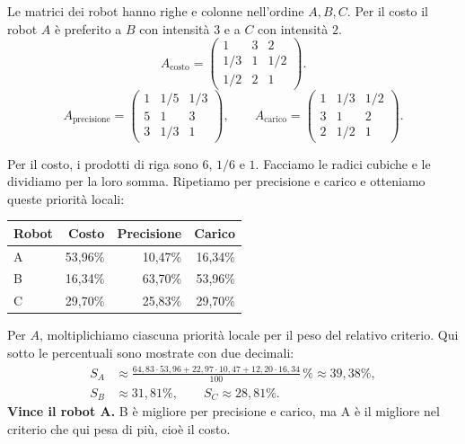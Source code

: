 \noindent Le matrici dei robot hanno righe e colonne nell'ordine
$A,B,C$. Per il costo il robot $A$ è preferito a $B$ con intensità
$3$ e a $C$ con intensità $2$.
\[
    A_{\text{costo}}=\begin{pmatrix}
        1 & 3 & 2\\
        1/3 & 1 & 1/2\\
        1/2 & 2 & 1
    \end{pmatrix}.
\]
\[
    A_{\text{precisione}}=\begin{pmatrix}
        1 & 1/5 & 1/3\\
        5 & 1 & 3\\
        3 & 1/3 & 1
    \end{pmatrix},
    \qquad
    A_{\text{carico}}=\begin{pmatrix}
        1 & 1/3 & 1/2\\
        3 & 1 & 2\\
        2 & 1/2 & 1
    \end{pmatrix}.
\]

\noindent Per il costo, i prodotti di riga sono $6$, $1/6$ e $1$.
Facciamo le radici cubiche e le dividiamo per la loro somma.
Ripetiamo per precisione e carico e otteniamo queste priorità locali:
\begin{center}
    \begin{tabular}{lrrr}
        \hline
        Robot & Costo & Precisione & Carico \\
        \hline
        A & 53,96\% & 10,47\% & 16,34\% \\
        B & 16,34\% & 63,70\% & 53,96\% \\
        C & 29,70\% & 25,83\% & 29,70\% \\
        \hline
    \end{tabular}
\end{center}

\noindent Per $A$, moltiplichiamo ciascuna priorità locale
per il peso del relativo criterio. Qui sotto le percentuali
sono mostrate con due decimali:
\begin{align*}
    S_A &\approx \frac{64{,}83\cdot53{,}96
                     +22{,}97\cdot10{,}47
                     +12{,}20\cdot16{,}34}{100}\,\%
          \approx 39{,}38\%, \\
    S_B &\approx 31{,}81\%, \qquad S_C \approx 28{,}81\%.
\end{align*}
\noindent \textbf{Vince il robot A.} B è migliore per precisione
e carico, ma A è il migliore nel criterio che qui pesa di più,
cioè il costo.

